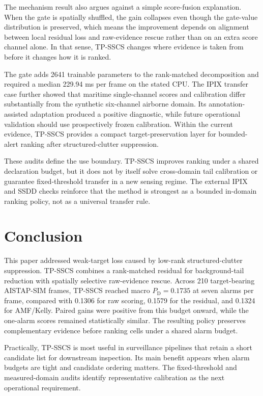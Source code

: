 \documentclass[journal]{IEEEtran}
\begin{document}
The mechanism result also argues against a simple score-fusion explanation. When the gate is spatially shuffled, the gain collapses even though the gate-value distribution is preserved, which means the improvement depends on alignment between local residual loss and raw-evidence rescue rather than on an extra score channel alone. In that sense, TP-SSCS changes where evidence is taken from before it changes how it is ranked.

The gate adds 2641 trainable parameters to the rank-matched decomposition and required a median 229.94 ms per frame on the stated CPU. The IPIX transfer case further showed that maritime single-channel scores and calibration differ substantially from the synthetic six-channel airborne domain. Its annotation-assisted adaptation produced a positive diagnostic, while future operational validation should use prospectively frozen calibration. Within the current evidence, TP-SSCS provides a compact target-preservation layer for bounded-alert ranking after structured-clutter suppression.

These audits define the use boundary. TP-SSCS improves ranking under a shared declaration budget, but it does not by itself solve cross-domain tail calibration or guarantee fixed-threshold transfer in a new sensing regime. The external IPIX and SSDD checks reinforce that the method is strongest as a bounded in-domain ranking policy, not as a universal transfer rule.

\section{Conclusion}

This paper addressed weak-target loss caused by low-rank structured-clutter suppression. TP-SSCS combines a rank-matched residual for background-tail reduction with spatially selective raw-evidence rescue. Across 210 target-bearing AISTAP-SIM frames, TP-SSCS reached macro $P_{\mathrm{D}}=0.1735$ at seven alarms per frame, compared with 0.1306 for raw scoring, 0.1579 for the residual, and 0.1324 for AMF/Kelly. Paired gains were positive from this budget onward, while the one-alarm scores remained statistically similar. The resulting policy preserves complementary evidence before ranking cells under a shared alarm budget.

Practically, TP-SSCS is most useful in surveillance pipelines that retain a short candidate list for downstream inspection. Its main benefit appears when alarm budgets are tight and candidate ordering matters. The fixed-threshold and measured-domain audits identify representative calibration as the next operational requirement.
\end{document}

